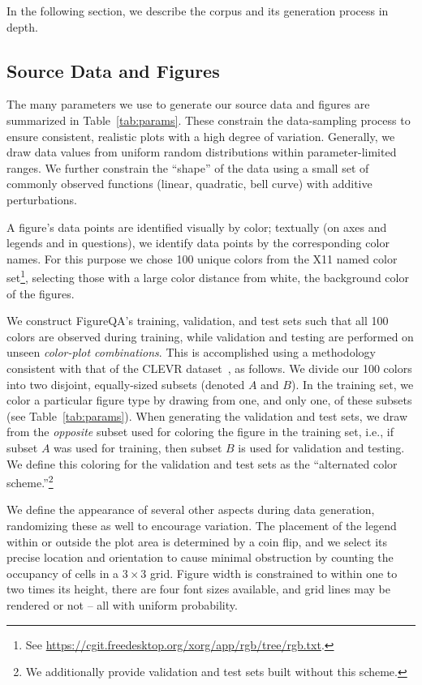 \documentclass{article} \usepackage{iclr2018_workshop,times}
\begin{document}
In the following section, we describe the corpus and its generation process in depth.

\subsection{Source Data and Figures}
\label{sec:source_data_and_figures}
The many parameters we use to generate our source data and figures are summarized in Table~\ref{tab:params}.
These constrain the data-sampling process to ensure consistent, realistic plots with a high degree of variation.
Generally, we draw data values from uniform random distributions within parameter-limited ranges.
We further constrain the ``shape'' of the data using a small set of commonly observed functions (linear, quadratic, bell curve) with additive perturbations.

A figure's data points are identified visually by color; textually (on axes and legends and in questions), we identify data points by the corresponding color names.
For this purpose we chose 100 unique colors from the X11 named color set\footnote{See \url{https://cgit.freedesktop.org/xorg/app/rgb/tree/rgb.txt}.}, selecting those with a large color distance from white, the background color of the figures.

We construct FigureQA's training, validation, and test sets such that all 100 colors are observed during training, while validation and testing are performed on unseen \emph{color-plot combinations}.
This is accomplished using a methodology consistent with that of the CLEVR dataset~\citep{johnson2016clevr}, as follows.
We divide our 100 colors into two disjoint, equally-sized subsets (denoted $A$ and $B$). In the training set, we color a particular figure type by drawing from one, and only one, of these subsets (see Table~\ref{tab:params}).
When generating the validation and test sets, we draw from the \emph{opposite} subset used for coloring the figure in the training set, i.e., if subset $A$ was used for training, then subset $B$ is used for validation and testing.
We define this coloring for the validation and test sets as the  ``alternated color scheme.''\footnote{We additionally provide validation and test sets built without this scheme.}

We define the appearance of several other aspects during data generation, randomizing these as well to encourage variation.
The placement of the legend within or outside the plot area is determined by a coin flip, and we select its precise location and orientation to cause minimal obstruction by counting the occupancy of cells in a $3\times3$ grid.
Figure width is constrained to within one to two times its height, there are four font sizes available, and grid lines may be rendered or not -- all with uniform probability.
\end{document}
